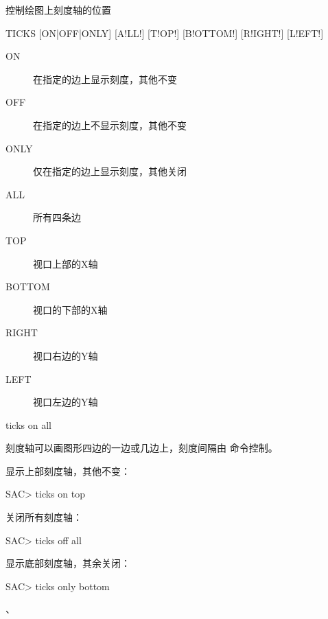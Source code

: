 \label{cmd:ticks}

控制绘图上刻度轴的位置

\begin{SACSTX}
TICKS [ON|OFF|ONLY] [A!LL!] [T!OP!] [B!OTTOM!] [R!IGHT!] [L!EFT!]
\end{SACSTX}

\begin{description}
\item [ON] 在指定的边上显示刻度，其他不变
\item [OFF] 在指定的边上不显示刻度，其他不变
\item [ONLY] 仅在指定的边上显示刻度，其他关闭
\item [ALL] 所有四条边
\item [TOP] 视口上部的X轴
\item [BOTTOM] 视口的下部的X轴
\item [RIGHT] 视口右边的Y轴
\item [LEFT] 视口左边的Y轴
\end{description}

\begin{SACDFT}
ticks on all
\end{SACDFT}

刻度轴可以画图形四边的一边或几边上，刻度间隔由  命令控制。

显示上部刻度轴，其他不变：
\begin{SACCode}
SAC> ticks on top
\end{SACCode}

关闭所有刻度轴：
\begin{SACCode}
SAC> ticks off all
\end{SACCode}

显示底部刻度轴，其余关闭：
\begin{SACCode}
SAC> ticks only bottom
\end{SACCode}

、
